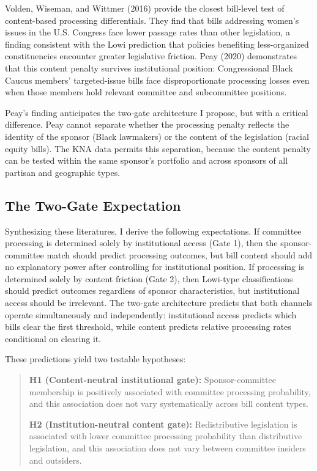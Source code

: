 \documentclass[11pt]{article}
\begin{document}
Volden, Wiseman, and Wittmer (2016) provide the closest bill-level test of content-based processing differentials. They find that bills addressing women's issues in the U.S. Congress face lower passage rates than other legislation, a finding consistent with the Lowi prediction that policies benefiting less-organized constituencies encounter greater legislative friction. Peay (2020) demonstrates that this content penalty survives institutional position: Congressional Black Caucus members' targeted-issue bills face disproportionate processing losses even when those members hold relevant committee and subcommittee positions.

Peay's finding anticipates the two-gate architecture I propose, but with a critical difference. Peay cannot separate whether the processing penalty reflects the identity of the sponsor (Black lawmakers) or the content of the legislation (racial equity bills). The KNA data permits this separation, because the content penalty can be tested within the same sponsor's portfolio and across sponsors of all partisan and geographic types.

\subsection{The Two-Gate Expectation}\label{sec:twogate}

Synthesizing these literatures, I derive the following expectations. If committee processing is determined solely by institutional access (Gate 1), then the sponsor-committee match should predict processing outcomes, but bill content should add no explanatory power after controlling for institutional position. If processing is determined solely by content friction (Gate 2), then Lowi-type classifications should predict outcomes regardless of sponsor characteristics, but institutional access should be irrelevant. The two-gate architecture predicts that both channels operate simultaneously and independently: institutional access predicts which bills clear the first threshold, while content predicts relative processing rates conditional on clearing it.

These predictions yield two testable hypotheses:

\begin{quote}
\textbf{H1 (Content-neutral institutional gate):} Sponsor-committee membership is positively associated with committee processing probability, and this association does not vary systematically across bill content types.

\medskip

\textbf{H2 (Institution-neutral content gate):} Redistributive legislation is associated with lower committee processing probability than distributive legislation, and this association does not vary between committee insiders and outsiders.
\end{quote}
\end{document}
